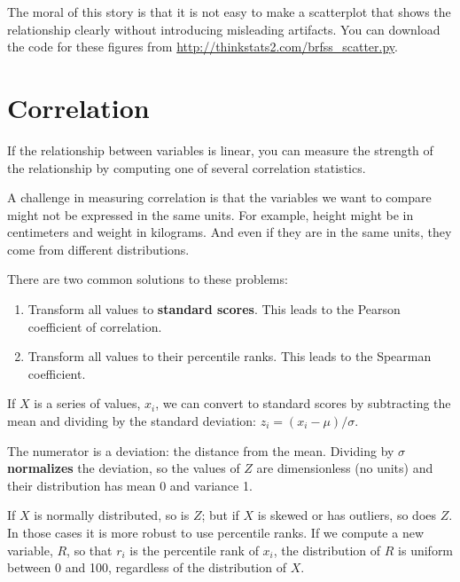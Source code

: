\documentclass[12pt]{book}
\begin{document}
The moral of this story is that it is
not easy to make a scatterplot that shows the relationship clearly
without introducing misleading artifacts.
You can download the code for these figures from
\url{http://thinkstats2.com/brfss_scatter.py}.


\section{Correlation}

If the relationship between variables is linear, you can measure
the strength of the relationship by computing one of several
correlation statistics.

A challenge in measuring correlation is that the variables we want
to compare might not be expressed in the same units.  For example, height
might be in centimeters and weight in kilograms.  And even if they are
in the same units, they come from different distributions.

There are two common solutions to these problems:

\begin{enumerate}

\item Transform all values to {\bf standard scores}.  This leads to
the Pearson coefficient of correlation.

\item Transform all values to their percentile ranks.  This
leads to the Spearman coefficient.

\end{enumerate}

If $X$ is a series of values, $x_i$, we can convert to standard
scores by subtracting the mean and dividing by the standard deviation:
$z_i = (x_i - \mu) / \sigma$.

The numerator is a deviation: the distance from the mean.  Dividing by
$\sigma$ {\bf normalizes} the deviation, so the values of $Z$ are
dimensionless (no units) and their distribution has mean 0 and
variance 1.

If $X$ is normally distributed, so is $Z$; but if $X$ is skewed or has
outliers, so does $Z$.  In those cases it is more robust to use
percentile ranks.  If we compute a new variable, $R$, so that $r_i$ is
the percentile rank of $x_i$, the distribution of $R$ is uniform
between 0 and 100, regardless of the distribution of $X$.
 
\end{document}
